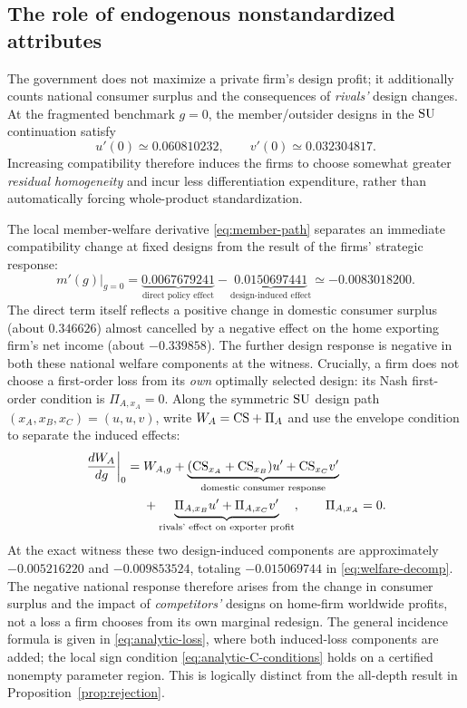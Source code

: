 \subsection{The role of endogenous nonstandardized attributes}

The government does not maximize a private firm's
design profit; it additionally counts national
consumer surplus and the consequences of \emph{rivals'}
design changes. At the fragmented benchmark $g=0$,
the member/outsider designs in the $\mathrm{SU}$ continuation
satisfy
\[
 u'(0)\simeq0.060810232,\qquad
 v'(0)\simeq0.032304817 .
\]
Increasing compatibility therefore induces the firms
to choose somewhat greater \emph{residual homogeneity}
and incur less differentiation expenditure, rather than
automatically forcing whole-product standardization.

The local member-welfare derivative
\eqref{eq:member-path} separates an immediate
compatibility change at fixed designs from the
result of the firms' strategic response:
\begin{equation}\label{eq:welfare-decomp}
 \left.m'(g)\right|_{g=0}
 =
 \underbrace{0.0067679241}_{\text{direct policy effect}}
 -
 \underbrace{0.0150697441}_{\text{design-induced effect}}
 \simeq -0.0083018200.
\end{equation}
The direct term itself reflects a positive change in
domestic consumer surplus (about $0.346626$)
almost cancelled by a negative effect on the
home exporting firm's net income (about $-0.339858$).
The further design response is negative in both
these national welfare components at the witness.
Crucially, a firm does not choose a first-order
loss from its \emph{own} optimally selected design:
its Nash first-order condition is
$\Pi_{A,x_A}=0$. Along the symmetric $\mathrm{SU}$
design path $(x_A,x_B,x_C)=(u,u,v)$,
write $W_A=\mathrm{CS}+\Pi_A$ and use the envelope
condition to separate the induced effects:
\begin{equation}\label{eq:member-envelope}
\begin{aligned}
\left.\frac{dW_A}{dg}\right|_{0}
={}&W_{A,g}
+\underbrace{(\mathrm{CS}_{x_A}+\mathrm{CS}_{x_B})u'
              +\mathrm{CS}_{x_C}v'}_{\text{domestic consumer response}}\\
&+\underbrace{\Pi_{A,x_B}u'
              +\Pi_{A,x_C}v'}_{\text{rivals' effect on exporter profit}},
\qquad \Pi_{A,x_A}=0.
\end{aligned}
\end{equation}
At the exact witness these two design-induced
components are approximately $-0.005216220$
and $-0.009853524$, totaling $-0.015069744$
in \eqref{eq:welfare-decomp}. The negative
national response therefore arises from the
change in consumer surplus and the impact of
\emph{competitors'} designs on home-firm
worldwide profits, not a loss a firm chooses
from its own marginal redesign. The general incidence
formula is given in \eqref{eq:analytic-loss}, where both
induced-loss components are added; the local sign condition
\eqref{eq:analytic-C-conditions} holds on a certified
nonempty parameter region. This is logically distinct from
the all-depth result in Proposition~\ref{prop:rejection}.

